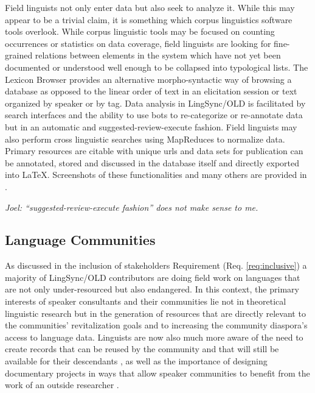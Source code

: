 \documentclass[11pt]{article}
\begin{document}
\label{sec:fieldlinguists}
Field linguists not only enter data but also seek to analyze it. While this may appear to be a trivial claim, it is something which corpus linguistics software tools overlook. While corpus linguistic tools may be focused on counting occurrences or statistics on data coverage, field linguists are looking for fine-grained relations between elements in the system which have not yet been documented or understood well enough to be collapsed into typological lists. The Lexicon Browser provides an alternative morpho-syntactic way of browsing a database as opposed to the linear order of text in an elicitation session or text organized by speaker or by tag. Data analysis in LingSync/OLD is facilitated by search  interfaces and the ability to use bots to re-categorize or re-annotate data but in an automatic and suggested-review-execute fashion. Field linguists may also perform cross linguistic searches using MapReduces to normalize data. Primary resources are citable with unique urls and data sets for publication can be annotated, stored and discussed in the database itself and directly exported into LaTeX.  Screenshots of these functionalities and many others are provided in \cite{lingsync:2012}.

\textit{Joel: ``suggested-review-execute fashion'' does not make sense to me.}

%
\subsection{Language Communities}

\label{sec:lang-comunities}
As discussed in the inclusion of stakeholders Requirement (Req. \autoref{req:inclusive}) a majority of LingSync/OLD contributors are doing field work on languages that
are not only under-resourced but also endangered. In this context, the primary
interests of speaker consultants and their communities lie not in theoretical
linguistic research but in the generation of resources that are directly
relevant to the communities' revitalization goals and to increasing the community diaspora's
access to language data. Linguists are now also much more aware of the need to
create records that can be reused by the community and that will still be
available for their descendants \cite[p.129]{Thieberger:2012}, as well as the
importance of designing documentary projects in ways that allow speaker
communities to benefit from the work of an outside researcher \cite{Good:2012}.
\end{document}
